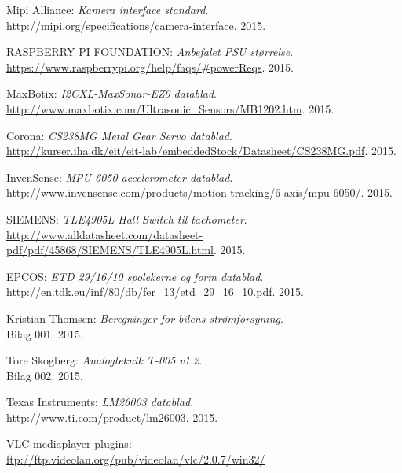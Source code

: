\renewcommand{\bibname}{Litteraturliste}
\fancyhead[CE,CO]{}
\fancyfoot[CE,CO]{}
\begin{thebibliography}{2}

 Mipi Alliance: \textit{Kamera interface standard}. \\ 
\url{http://mipi.org/specifications/camera-interface}. 2015.

 RASPBERRY PI FOUNDATION: \textit{Anbefalet PSU størrelse}. \\
\url{https://www.raspberrypi.org/help/faqs/#powerReqs}. 2015.

 MaxBotix: \textit{I2CXL-MaxSonar-EZ0 datablad}. \\
\url{http://www.maxbotix.com/Ultrasonic_Sensors/MB1202.htm}. 2015.

 Corona: \textit{CS238MG Metal Gear Servo datablad}. \\
\url{http://kurser.iha.dk/eit/eit-lab/embeddedStock/Datasheet/CS238MG.pdf}. 2015.

 InvenSense: \textit{MPU-6050 accelerometer datablad}. \\
\url{http://www.invensense.com/products/motion-tracking/6-axis/mpu-6050/}. 2015.

 SIEMENS: \textit{TLE4905L Hall Switch til tachometer}. \\
\url{http://www.alldatasheet.com/datasheet-pdf/pdf/45868/SIEMENS/TLE4905L.html}. 2015.

 EPCOS: \textit{ETD 29/16/10 spolekerne og form datablad}. \\
\url{http://en.tdk.eu/inf/80/db/fer_13/etd_29_16_10.pdf}. 2015.

 Kristian Thomsen: \textit{Beregninger for bilens strømforsyning}. \\
Bilag 001. 2015.

 Tore Skogberg: \textit{Analogteknik T-005 v1.2}.\\
Bilag 002. 2015.

 Texas Instruments: \textit{LM26003 datablad}. \\
\url{http://www.ti.com/product/lm26003}. 2015.

 VLC mediaplayer plugins: \\
\url{ftp://ftp.videolan.org/pub/videolan/vlc/2.0.7/win32/}


\end{thebibliography}
